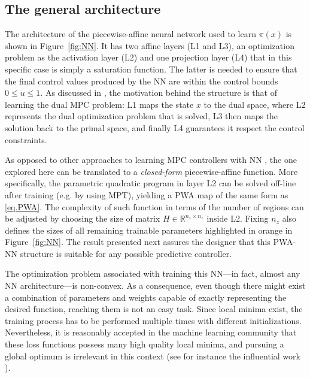 \subsection{The general architecture}

The architecture of the piecewise-affine neural network used to learn $\pi(x)$ is shown in Figure~\ref{fig:NN}. It has two affine layers (L1 and L3), an optimization problem as the activation layer \cite{amos2017optnet} (L2) and one projection layer (L4) that in this specific case is simply a saturation function. The latter is needed to ensure that the final control values produced by the NN are within the control bounds $0 \leq u \leq 1$. As discussed in \cite{maddalena2019neural}, the motivation behind the structure is that of learning the dual MPC problem: L1 maps the state $x$ to the dual space, where L2 represents the dual optimization problem that is solved, L3 then maps the solution back to the primal space, and finally L4 guarantees it respect the control constraints. 

As opposed to other approaches to learning MPC controllers with NN \cite{zhang2020near,lucia2020deep}, the one explored here can be translated to a \textit{closed-form} piecewise-affine function. More specifically, the parametric quadratic program in layer L2 can be solved off-line after training (e.g. by using MPT), yielding a PWA map of the same form as \eqref{eq.PWA}. The complexity of such function in terms of the number of regions can be adjusted by choosing the size of matrix $H \in \mathbb{R}^{n_z \times n_z}$ inside L2. Fixing $n_z$ also defines the sizes of all remaining trainable parameters highlighted in orange in Figure~\ref{fig:NN}. The result presented next assures the designer that this PWA-NN structure is suitable for any possible predictive controller.


The optimization problem associated with training this NN---in fact, almost any NN architecture---is non-convex. As a consequence, even though there might exist a combination of parameters and weights capable of exactly representing the desired function, reaching them is not an easy task. Since local minima exist, the training process has to be performed multiple times with different initializations. Nevertheless, it is reasonably accepted in the machine learning community that these loss functions possess many high quality local minima, and pursuing a global optimum is irrelevant in this context (see for instance the influential work \cite{choromanska2015loss}).

